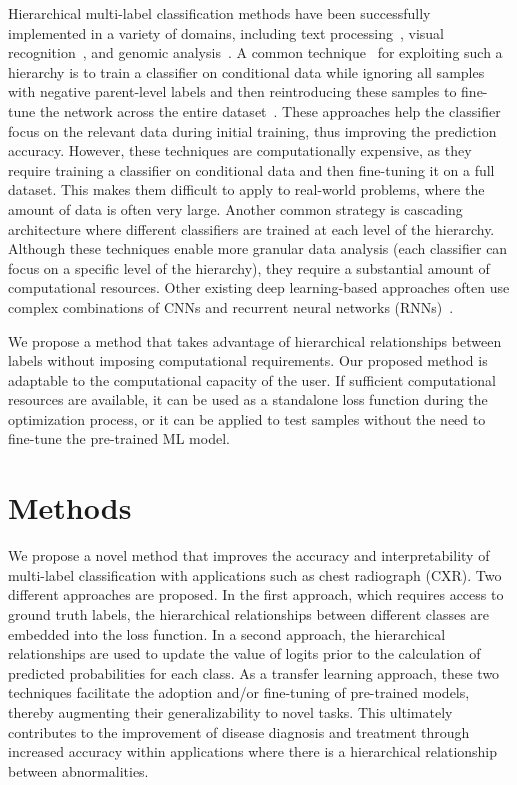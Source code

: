Hierarchical multi-label classification methods have been successfully implemented in a variety of domains, including text processing~\cite{aly_Hierarchical_2019}, visual recognition~\cite{bi_Mandatory_2014}, and genomic analysis~\cite{bi_BayesOptimal_2015}. A common technique~\cite{chen_Deep_2019} for exploiting such a hierarchy is to train a classifier on conditional data while ignoring all samples with negative parent-level labels and then reintroducing these samples to fine-tune the network across the entire dataset~\cite{chen_Deep_2019}. These approaches help the classifier focus on the relevant data during initial training, thus improving the prediction accuracy.  However, these techniques are computationally expensive, as they require training a classifier on conditional data and then fine-tuning it on a full dataset. This makes them difficult to apply to real-world problems, where the amount of data is often very large.   Another common strategy is cascading architecture where different classifiers are trained at each level of the hierarchy. Although these techniques enable more granular data analysis (each classifier can focus on a specific level of the hierarchy), they require a substantial amount of computational resources. Other existing deep learning-based approaches often use complex combinations of CNNs and recurrent neural networks (RNNs)~\cite{guo_CNNRNN_2018,kowsari_HDLTex_2017}.

We propose a method that takes advantage of hierarchical relationships between labels without imposing computational requirements. Our proposed method is adaptable to the computational capacity of the user. If sufficient computational resources are available, it can be used as a standalone loss function during the optimization process, or it can be applied to test samples without the need to fine-tune the pre-trained ML model.

\section{Methods}\label{sec:methods}
We propose a novel method that improves the accuracy and interpretability of multi-label classification with applications such as chest radiograph (CXR). Two different approaches are proposed.  In the first approach, which requires access to ground truth labels, the hierarchical relationships between different classes are embedded into the loss function. In a second approach, the hierarchical relationships are used to update the value of logits prior to the calculation of predicted probabilities for each class.  As a transfer learning approach, these two techniques facilitate the adoption and/or fine-tuning of pre-trained models, thereby augmenting their generalizability to novel tasks. This ultimately contributes to the improvement of disease diagnosis and treatment through increased accuracy within applications where there is a hierarchical relationship between abnormalities.

